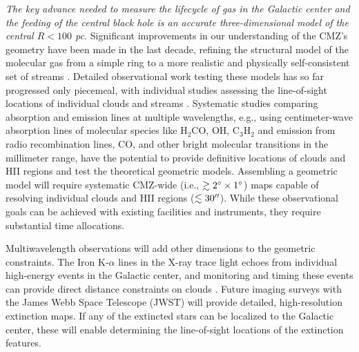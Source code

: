 \documentclass[modern]{aastex62}
\begin{document}
\textit{The key advance needed to measure the lifecycle of gas in the Galactic
center and the feeding of the central black hole is an accurate
three-dimensional model of the central $R<100$ pc.} Significant improvements in
our understanding
of the CMZ's geometry have been made in the last decade, refining the structural
model of the molecular gas from a simple ring to a more realistic and physically
self-consistent set of streams
\citep{Molinari2011a,Kruijssen2015a,Ridley2017a,Sormani2018a,Kruijssen2019b}.
Detailed observational work testing these models has so far progressed only
piecemeal, with individual studies assessing the line-of-sight locations of
individual clouds and streams \citep[e.g.][]{Henshaw2016a,Butterfield2018a}.
Systematic studies
comparing absorption and emission lines at multiple wavelengths, e.g., using
centimeter-wave absorption lines of molecular species like H$_2$CO, OH,
C$_3$H$_2$ and emission from radio recombination lines, CO, and other bright
molecular transitions in the millimeter range, have the potential to provide
definitive locations of clouds and HII regions and test the theoretical
geometric models.  Assembling a geometric model will require systematic
CMZ-wide (i.e., $\gtrsim2^{\circ}\times1^{\circ}$) maps capable of resolving
individual clouds and HII regions ($\lesssim30\mbox{$^{\prime\prime}$}$).  While these
observational goals can be achieved with existing facilities and instruments,
they require substantial time allocations.

Multiwavelength observations will add other dimensions to the geometric constraints.
The Iron K-$\alpha$ lines in the X-ray trace light echoes from individual
high-energy events in the Galactic center, and monitoring and timing these
events can provide direct distance constraints on clouds
\citep[e.g.][]{Clavel2014a,Churazov2017b,Churazov2017a,Terrier2018a}. Future
imaging surveys with the James Webb Space Telescope (JWST) will provide
detailed, high-resolution extinction maps. If any of the extincted stars can be
localized to the Galactic center, these will enable determining the
line-of-sight locations of the extinction features.
\end{document}
